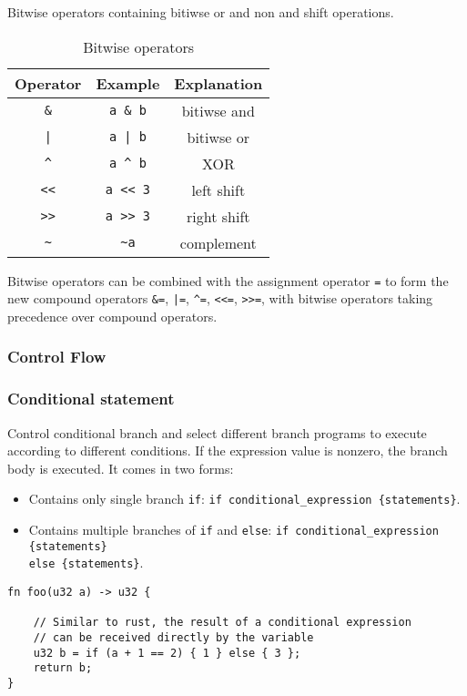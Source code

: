 Bitwise operators containing bitiwse or and non and shift operations.
\begin{table}
\centering
\begin{tabular}{c|c|c}
    Operator & Example & Explanation \\ \hline
    \verb|&| & \verb|a & b| & bitiwse and \\
    \verb!|! & \verb!a | b! & bitiwse or \\
    \verb|^| & \verb|a ^ b| & XOR \\
    \verb|<<| & \verb|a << 3| & left shift  \\
    \verb|>>| & \verb|a >> 3| & right shift  \\
    \verb|~| & \verb|~a| & complement \\
\end{tabular}
\caption{Bitwise operators}
\end{table}

Bitwise operators can be combined with the assignment operator \verb|=| to form the new compound operators \verb|&=|, \verb!|=!, \verb|^=|, \verb|<<=|, \verb|>>=|, 
with bitwise operators taking precedence over compound operators.

\subsubsection{Control Flow}

\subsubsection*{Conditional statement}

Control conditional branch and select different branch programs to execute according to different conditions. 
If the expression value is nonzero, the branch body is executed.
It comes in two forms:

\begin{itemize}
    \item Contains only single branch \verb|if|: \verb|if conditional_expression {statements}|.
    \item Contains multiple branches of \verb|if| and \verb|else|: 
    \verb|if conditional_expression {statements}| \\
    \verb|else {statements}|.

\end{itemize}

\begin{lstlisting}
fn foo(u32 a) -> u32 {
    
    // Similar to rust, the result of a conditional expression 
    // can be received directly by the variable
    u32 b = if (a + 1 == 2) { 1 } else { 3 };
    return b;
}
\end{lstlisting}

